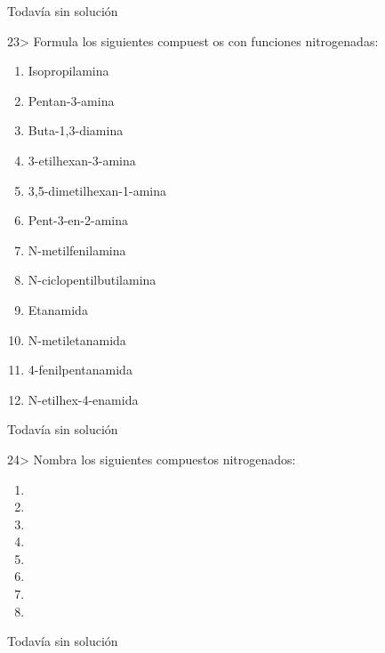 \documentclass{article}
\begin{document}
\begin{solution}[print=false]
  Todavía sin solución
\end{solution}

\begin{exercise}
  23> Formula los siguientes compuest os con funciones nitrogenadas:
  \begin{enumerate}
    \item Isopropilamina
    \item Pentan-3-amina
    \item Buta-1,3-diamina
    \item 3-etilhexan-3-amina
    \item 3,5-dimetilhexan-1-amina
    \item Pent-3-en-2-amina
    \item N-metilfenilamina
    \item N-ciclopentilbutilamina
    \item Etanamida
    \item N-metiletanamida
    \item 4-fenilpentanamida
    \item N-etilhex-4-enamida
  \end{enumerate}
\end{exercise}

\begin{solution}[print=false]
  Todavía sin solución
\end{solution}

\begin{exercise}
  24> Nombra los siguientes compuestos nitrogenados:
  \begin{enumerate}
    \item {}
    \item {}
    \item {}
    \item {}
    \item {}
    \item {}
    \item {}
    \item {}
  \end{enumerate}
\end{exercise}

\begin{solution}[print=false]
  Todavía sin solución
\end{solution}
\end{document}
